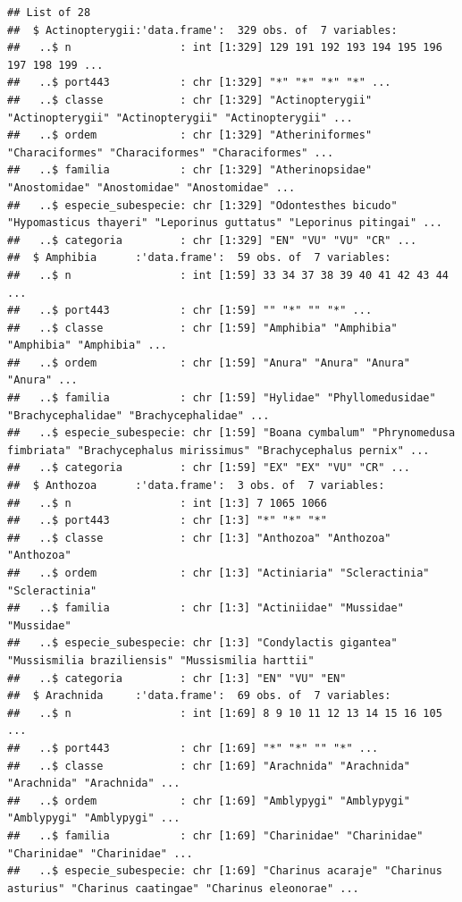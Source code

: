 \documentclass[
]{article}
\begin{document}
\begin{verbatim}
## List of 28
##  $ Actinopterygii:'data.frame':  329 obs. of  7 variables:
##   ..$ n                 : int [1:329] 129 191 192 193 194 195 196 197 198 199 ...
##   ..$ port443           : chr [1:329] "*" "*" "*" "*" ...
##   ..$ classe            : chr [1:329] "Actinopterygii" "Actinopterygii" "Actinopterygii" "Actinopterygii" ...
##   ..$ ordem             : chr [1:329] "Atheriniformes" "Characiformes" "Characiformes" "Characiformes" ...
##   ..$ familia           : chr [1:329] "Atherinopsidae" "Anostomidae" "Anostomidae" "Anostomidae" ...
##   ..$ especie_subespecie: chr [1:329] "Odontesthes bicudo" "Hypomasticus thayeri" "Leporinus guttatus" "Leporinus pitingai" ...
##   ..$ categoria         : chr [1:329] "EN" "VU" "VU" "CR" ...
##  $ Amphibia      :'data.frame':  59 obs. of  7 variables:
##   ..$ n                 : int [1:59] 33 34 37 38 39 40 41 42 43 44 ...
##   ..$ port443           : chr [1:59] "" "*" "" "*" ...
##   ..$ classe            : chr [1:59] "Amphibia" "Amphibia" "Amphibia" "Amphibia" ...
##   ..$ ordem             : chr [1:59] "Anura" "Anura" "Anura" "Anura" ...
##   ..$ familia           : chr [1:59] "Hylidae" "Phyllomedusidae" "Brachycephalidae" "Brachycephalidae" ...
##   ..$ especie_subespecie: chr [1:59] "Boana cymbalum" "Phrynomedusa fimbriata" "Brachycephalus mirissimus" "Brachycephalus pernix" ...
##   ..$ categoria         : chr [1:59] "EX" "EX" "VU" "CR" ...
##  $ Anthozoa      :'data.frame':  3 obs. of  7 variables:
##   ..$ n                 : int [1:3] 7 1065 1066
##   ..$ port443           : chr [1:3] "*" "*" "*"
##   ..$ classe            : chr [1:3] "Anthozoa" "Anthozoa" "Anthozoa"
##   ..$ ordem             : chr [1:3] "Actiniaria" "Scleractinia" "Scleractinia"
##   ..$ familia           : chr [1:3] "Actiniidae" "Mussidae" "Mussidae"
##   ..$ especie_subespecie: chr [1:3] "Condylactis gigantea" "Mussismilia braziliensis" "Mussismilia harttii"
##   ..$ categoria         : chr [1:3] "EN" "VU" "EN"
##  $ Arachnida     :'data.frame':  69 obs. of  7 variables:
##   ..$ n                 : int [1:69] 8 9 10 11 12 13 14 15 16 105 ...
##   ..$ port443           : chr [1:69] "*" "*" "" "*" ...
##   ..$ classe            : chr [1:69] "Arachnida" "Arachnida" "Arachnida" "Arachnida" ...
##   ..$ ordem             : chr [1:69] "Amblypygi" "Amblypygi" "Amblypygi" "Amblypygi" ...
##   ..$ familia           : chr [1:69] "Charinidae" "Charinidae" "Charinidae" "Charinidae" ...
##   ..$ especie_subespecie: chr [1:69] "Charinus acaraje" "Charinus asturius" "Charinus caatingae" "Charinus eleonorae" ...

\end{verbatim}
\end{document}
